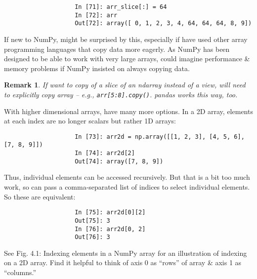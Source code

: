 \documentclass{article}
\newtheorem{remark}{Remark}
\begin{document}
\begin{enumerate}
\begin{itemize}
\begin{itemize}
\begin{itemize}
				\begin{verbatim}
					In [71]: arr_slice[:] = 64
					In [72]: arr
					Out[72]: array([ 0, 1, 2, 3, 4, 64, 64, 64, 8, 9])
				\end{verbatim}
				If new to NumPy, might be surprised by this, especially if have used other array programming languages that copy data more eagerly. As NumPy has been designed to be able to work with very large arrays, could imagine performance \& memory problems if NumPy insisted on always copying data.
				\begin{remark}
					If want to copy of a slice of an ndarray instead of a view, will need to explicitly copy array -- e.g., {\tt arr[5:8].copy()}. pandas works this way, too.
				\end{remark}
				With higher dimensional arrays, have many more options. In a 2D array, elements at each index are no longer scalars but rather 1D arrays:
				\begin{verbatim}
					In [73]: arr2d = np.array([[1, 2, 3], [4, 5, 6], [7, 8, 9]])
					In [74]: arr2d[2]
					Out[74]: array([7, 8, 9])
				\end{verbatim}
				Thus, individual elements can be accessed recursively. But that is a bit too much work, so can pass a comma-separated list of indices to select individual elements. So these are equivalent:
				\begin{verbatim}
					In [75]: arr2d[0][2]
					Out[75]: 3
					In [76]: arr2d[0, 2]
					Out[76]: 3
				\end{verbatim}
				See {\sf Fig. 4.1: Indexing elements in a NumPy array} for an illustration of indexing on a 2D array. Find it helpful to think of axis 0 as ``rows'' of array \& axis 1 as ``columns.''
				

\end{itemize}
\end{itemize}
\end{itemize}
\end{enumerate}
\end{document}
